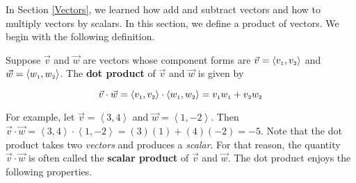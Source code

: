 

\setcounter{footnote}{0}

\label{DotProduct}

In Section \ref{Vectors}, we learned how add and subtract vectors and how to multiply vectors by scalars.  In this section, we define a product of vectors.  We begin with the following definition.

\smallskip
\colorbox{ResultColor}{\bbm
\begin{defn} \label{dotproductdefn}    Suppose $\vec{v}$ and $\vec{w}$ are vectors whose component forms are $\vec{v} = \left<v_{\mbox{\tiny $1$}},v_{\mbox{\tiny $2$}}\right>$ and $\vec{w} = \left<w_{\mbox{\tiny $1$}},w_{\mbox{\tiny $2$}}\right>$.  The \textbf{dot product} of $\vec{v}$ and $\vec{w}$ is given by

\[ \vec{v} \cdot \vec{w} = \left<v_{\mbox{\tiny $1$}},v_{\mbox{\tiny $2$}}\right> \cdot \left<w_{\mbox{\tiny $1$}},w_{\mbox{\tiny $2$}}\right> = v_{\mbox{\tiny $1$}}w_{\mbox{\tiny $1$}} + v_{\mbox{\tiny $2$}}w_{\mbox{\tiny $2$}} \]



\end{defn}
\ebm}
\smallskip

For example, let $\vec{v} = \left<3,4\right>$ and $\vec{w} = \left<1,-2\right>$.  Then $\vec{v} \cdot \vec{w} = \left<3,4\right> \cdot \left<1,-2\right> =  (3)(1) + (4)(-2) = -5$. Note that the dot product takes two \textit{vectors} and produces a \textit{scalar}.  For that reason, the quantity $\vec{v} \cdot \vec{w}$ is often called the \textbf{scalar product} of $\vec{v}$ and $\vec{w}$.  The dot product enjoys the following properties.

\smallskip

